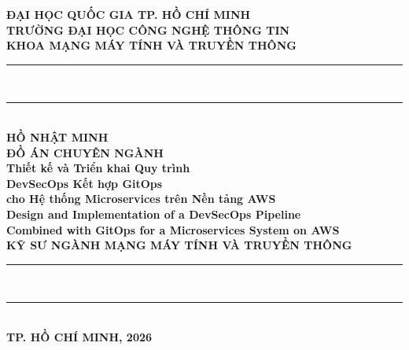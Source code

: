 \documentclass[13pt,a4paper,twoside]{extarticle}
\begin{document}
\pagestyle{empty}
\begin{center}

{\fontsize{14}{18}\bfseries ĐẠI HỌC QUỐC GIA TP. HỒ CHÍ MINH}\\[4pt]
{\fontsize{16}{20}\bfseries TRƯỜNG ĐẠI HỌC CÔNG NGHỆ THÔNG TIN}\\[4pt]
{\fontsize{16}{20}\bfseries KHOA MẠNG MÁY TÍNH VÀ TRUYỀN THÔNG}\\[40pt]

\rule{\textwidth}{1.5pt}\\[6pt]
\rule{\textwidth}{0.3pt}\\[30pt]

{\fontsize{14}{18}\bfseries HỒ NHẬT MINH}\\[40pt]

{\fontsize{16}{20}\bfseries ĐỒ ÁN CHUYÊN NGÀNH}\\[20pt]

{\fontsize{22}{28}\bfseries Thiết kế và Triển khai Quy trình}\\[6pt]
{\fontsize{22}{28}\bfseries DevSecOps Kết hợp GitOps}\\[6pt]
{\fontsize{22}{28}\bfseries cho Hệ thống Microservices trên Nền tảng AWS}\\[12pt]

{\fontsize{18}{22}\bfseries Design and Implementation of a DevSecOps Pipeline}\\[4pt]
{\fontsize{18}{22}\bfseries Combined with GitOps for a Microservices System on AWS}\\[40pt]

{\fontsize{14}{18}\bfseries KỸ SƯ NGÀNH MẠNG MÁY TÍNH VÀ TRUYỀN THÔNG}\\[40pt]

\rule{\textwidth}{0.3pt}\\[6pt]
\rule{\textwidth}{1.5pt}\\[30pt]

{\fontsize{13}{16}\bfseries TP. HỒ CHÍ MINH, 2026}

\end{center}
\restoregeometry

\newpage
\end{document}
